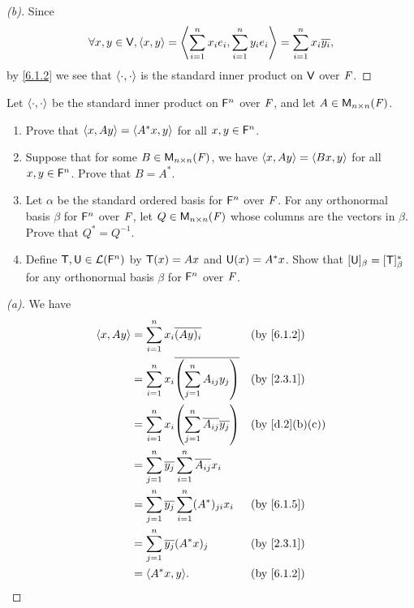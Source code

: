 \begin{proof}[(b)]
  Since
  \[
    \forall x, y \in \mathsf{V}, \left\langle x, y\right\rangle = \left\langle\sum_{i = 1}^n x_i e_i, \sum_{i = 1}^n y_i e_i\right\rangle = \sum_{i = 1}^n x_i \overline{y_i},
  \]
  by \cref{6.1.2} we see that \(\left\langle\cdot, \cdot\right\rangle\) is the standard inner product on \(\mathsf{V}\) over \(\mathit{F}\).
\end{proof}

\begin{ex}\label{ex:6.1.23}
  Let \(\left\langle\cdot, \cdot\right\rangle\) be the standard inner product on \(\mathsf{F}^n\) over \(\mathit{F}\), and let \(A \in \ms[n][n][\F]\).
  \begin{enumerate}
    \item Prove that \(\left\langle x, Ay\right\rangle = \left\langle A^* x, y\right\rangle\) for all \(x, y \in \mathsf{F}^n\).
    \item Suppose that for some \(B \in \ms[n][n][\F]\), we have \(\left\langle x, Ay\right\rangle = \left\langle Bx, y\right\rangle\) for all \(x, y \in \mathsf{F}^n\).
          Prove that \(B = A^*\).
    \item Let \(\alpha\) be the standard ordered basis for \(\mathsf{F}^n\) over \(\mathit{F}\).
          For any orthonormal basis \(\beta\) for \(\mathsf{F}^n\) over \(\mathit{F}\), let \(Q \in \ms[n][n][\F]\) whose columns are the vectors in \(\beta\).
          Prove that \(Q^* = Q^{-1}\).
    \item Define \(\mathsf{T}, \mathsf{U} \in \mathcal{L}(\mathsf{F}^n)\) by \(\mathsf{T}(x) = Ax\) and \(\mathsf{U}(x) = A^* x\).
          Show that \([\mathsf{U}]_{\beta} = [\mathsf{T}]_{\beta}^*\) for any orthonormal basis \(\beta\) for \(\mathsf{F}^n\) over \(\mathit{F}\).
  \end{enumerate}
\end{ex}

\begin{proof}[(a)]
  We have
  \begin{align*}
    \inn{x, Ay} & = \sum_{i = 1}^n x_i \conj{(Ay)_i}                                 &  & \by{6.1.2}    \\
                & = \sum_{i = 1}^n x_i \conj{\pa{\sum_{j = 1}^n A_{i j} y_j}}        &  & \by{2.3.1}    \\
                & = \sum_{i = 1}^n x_i \pa{\sum_{j = 1}^n \conj{A_{i j}} \conj{y_j}} &  & \by{d.2}[b,c] \\
                & = \sum_{j = 1}^n \conj{y_j} \sum_{i = 1}^n \conj{A_{i j}} x_i                         \\
                & = \sum_{j = 1}^n \conj{y_j} \sum_{i = 1}^n (A^*)_{j i} x_i         &  & \by{6.1.5}    \\
                & = \sum_{j = 1}^n \conj{y_j} (A^* x)_j                              &  & \by{2.3.1}    \\
                & = \inn{A^* x, y}.                                                  &  & \by{6.1.2}
  \end{align*}
\end{proof}

